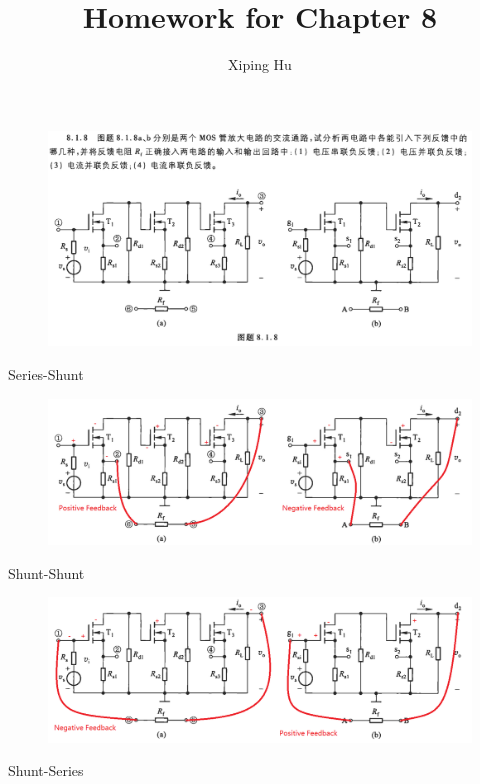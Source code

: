 \documentclass{article}
\author{Xiping Hu}
\affil{https://hxp.plus/}
\title{Homework for Chapter 8}
\begin{document}
\maketitle

\begin{figure}[H]
  \centering
  \includegraphics[width=\linewidth]{figures/Problem818}
\end{figure}

Series-Shunt

\begin{figure}[H]
  \centering
  \includegraphics[width=\linewidth]{figures/Problem8181}
\end{figure}

Shunt-Shunt

\begin{figure}[H]
  \centering
  \includegraphics[width=\linewidth]{figures/Problem8182}
\end{figure}

Shunt-Series
\end{document}
